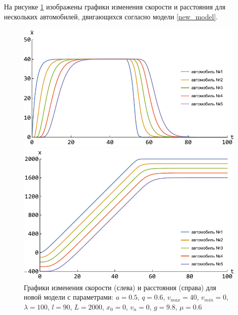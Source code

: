 \documentclass[12pt, a4paper]{extarticle}
\numberwithin{equation}{section}
\numberwithin{figure}{section}
\begin{document}
На рисунке \ref{new_model_picture} изображены графики изменения скорости и расстояния для нескольких автомобилей, двигающихся согласно модели \eqref{new_model}.

\begin{figure}[h!]
	\begin{center}
		\begin{minipage}[h!]{0.48\linewidth}
			\includegraphics[width=1\linewidth,height=0.2\textheight]
			{Images/new_model_speed.pdf}
		\end{minipage}
		\hfill 
		\begin{minipage}[h!]{0.48\linewidth}
			\includegraphics[width=1\linewidth,height=0.2\textheight]
			{Images/new_model_distanse.pdf}
		\end{minipage}
		\caption{Графики изменения скорости (слева) и расстояния (справа) для новой модели с параметрами: $a=0.5$, $q=0.6$, $v_{max}=40$, $v_{min}=0$, $\lambda=100$, $l=90$, $L=2000$, $x_0=0$, $v_n=0$, $g=9.8$, $\mu=0.6$ }
		\label{new_model_picture}
	\end{center}
\end{figure}
\end{document}
